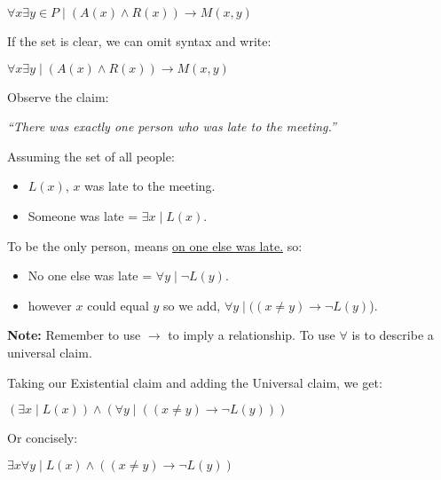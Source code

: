 \begin{center}
    \Large
    $\forall x \exists y \in P \mid (A(x)\land R(x)) \rightarrow M(x,y)$
\end{center}

\noindent
If the set is clear, we can omit syntax and write:\\

\begin{center}
    \Large
    $\forall x \exists y \mid (A(x)\land R(x)) \rightarrow M(x,y)$
\end{center}

\newpage

\noindent
Observe the claim:

\begin{center}
    \Large
    \textit{``There was exactly one person who was late to the meeting.''}
\end{center}


Assuming the set of all people:
\begin{itemize}
    \item $L(x)$, $x$ was late to the meeting.
    \item Someone was late = $\exists x \mid L(x)$.
\end{itemize}

To be the only person, means \underline{on one else was late.} so:
\begin{itemize}
    \item No one else was late = $\forall y\mid \neg L(y)$.
    \item however $x$ could equal $y$ so we add, $\forall y\mid (( x\neq y) \rightarrow \neg L(y)$).
\end{itemize}

\begin{Note}
    \textbf{Note:} Remember to use $\rightarrow$ to imply a relationship. To use $\forall$ is to describe a universal claim.
\end{Note}

\noindent
Taking our Existential claim and adding the Universal claim, we get:

\begin{center}
    \Large
    $(\exists x \mid L(x)) \land (\forall y\mid (( x\neq y) \rightarrow \neg L(y)))$
\end{center}

\noindent
Or concisely:

\begin{center}
    \Large
    $\exists x \forall y\mid L(x) \land (( x\neq y) \rightarrow \neg L(y))$

\end{center}

